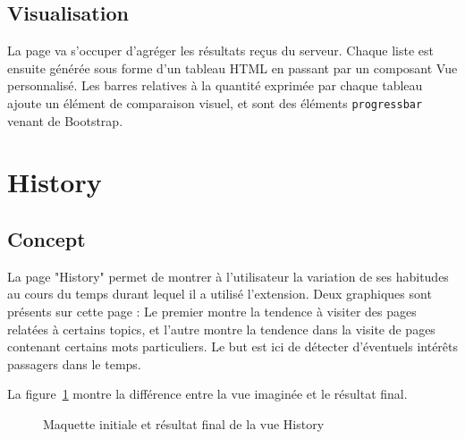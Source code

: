 	\subsection{Visualisation}

		La page va s'occuper d'agréger les résultats reçus du serveur. Chaque liste est ensuite générée sous forme d'un tableau HTML en passant par un composant Vue personnalisé. Les barres relatives à la quantité exprimée par chaque tableau ajoute un élément de comparaison visuel, et sont des éléments \texttt{progressbar} venant de Bootstrap.

\clearpage

%
%
%
%

\section{History}

	\subsection{Concept}

		La page "History" permet de montrer à l'utilisateur la variation de ses habitudes au cours du temps durant lequel il a utilisé l'extension. Deux graphiques sont présents sur cette page : Le premier montre la tendence à visiter des pages relatées à certains topics, et l'autre montre la tendence dans la visite de pages contenant certains mots particuliers. Le but est ici de détecter d'éventuels intérêts passagers dans le temps.

		La figure~\ref{history_images} montre la différence entre la vue imaginée et le résultat final.

		\begin{figure}[!h]
			\centering
			\caption{Maquette initiale et résultat final de la vue History}
			\label{history_images}
		\end{figure}

